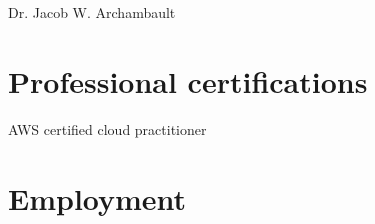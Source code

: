 \documentclass{prometheus_cv}
\begin{document}
	\thispagestyle{empty}					%
	\pagestyle{fancy}			 		%
	
	\vspace*{-1cm}
	\centering 
	\vspace*{-0.10em}
	\begin{Large} 
		Dr. Jacob W. Archambault
	\end{Large}
	
	\vspace*{0.25em}
	\begin{scshape}
		\begin{footnotesize}
			
		\end{footnotesize}
	\end{scshape}
	\vspace*{0.4cm}

	

\section{Professional certifications}
{%
	}
{%
	AWS certified cloud practitioner}
{}

\section{Employment}




%
%


\end{document}
